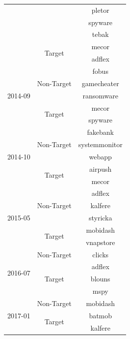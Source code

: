 \begin{itemize}[leftmargin=*]
\begin{table}[ht!]
\begin{center}
\begin{tabular}{ccc}
				&	& pletor \\
				&	& spyware \\
				&   & tebak   \\ \cline{2-3}
				& \multirow{2}{*}{Target} 	& mecor \\
				&   & adflex  \\
				\midrule
				\multirow{5}{*}{2014-09} & \multirow{3}{*}{Non-Target} 	& fobus \\ 
				&	& gamecheater \\
				&   & ransomware  \\ \cline{2-3}
				& \multirow{2}{*}{Target} 	& mecor \\
				&   & spyware  \\
				\midrule
				\multirow{5}{*}{2014-10} & \multirow{3}{*}{Non-Target} 	& fakebank \\ 
				&	& systemmonitor \\
				&   & webapp  \\ \cline{2-3}
				& \multirow{2}{*}{Target} 	& airpush \\
				&   & mecor  \\
				\midrule
				\multirow{5}{*}{2015-05} & \multirow{3}{*}{Non-Target} 	& adflex \\ 
				&	& kalfere \\
				&   & styricka  \\ \cline{2-3}
				& \multirow{2}{*}{Target} 	& mobidash \\
				&   & vnapstore  \\
				\midrule
				\multirow{4}{*}{2016-07} & \multirow{1}{*}{Non-Target} 	& clicks \\  \cline{2-3}
				& \multirow{3}{*}{Target} 	& adflex \\
				&   & blouns  \\
				&   & mspy    \\
				\midrule
				\multirow{3}{*}{2017-01} & \multirow{1}{*}{Non-Target} 	& mobidash \\  \cline{2-3}
				& \multirow{2}{*}{Target} 	& batmob \\
				&   & kalfere  \\
				\midrule
			\end{tabular}
		\end{center}
	\end{table}
	

\end{itemize}
